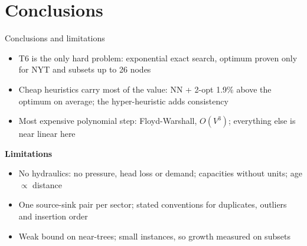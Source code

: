 \section{Conclusions}
\begin{frame}{Conclusions and limitations}
  \begin{itemize}
    \item T6 is the only hard problem: exponential exact search, optimum proven only for NYT and subsets up to 26 nodes
    \item Cheap heuristics carry most of the value: NN + 2-opt 1.9\% above the optimum on average; the hyper-heuristic adds consistency
    \item Most expensive polynomial step: Floyd-Warshall, $O(V^3)$; everything else is near linear here
  \end{itemize}
  \vspace{0.4em}
  \textbf{Limitations}
  \begin{itemize}\small
    \item No hydraulics: no pressure, head loss or demand; capacities without units; age $\propto$ distance
    \item One source-sink pair per sector; stated conventions for duplicates, outliers and insertion order
    \item Weak bound on near-trees; small instances, so growth measured on subsets
  \end{itemize}
\end{frame}
